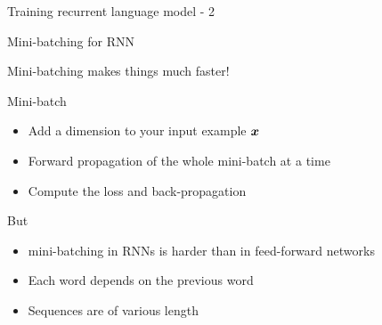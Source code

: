 \begin{frame}{Training recurrent language model - 2}
\begin{center}
      \end{center}
\end{frame}




\begin{frame}{Mini-batching for RNN}
  \begin{center}
    Mini-batching makes things much faster!
  \end{center}
  \begin{block}{Mini-batch}
    \begin{itemize}
    \item Add a dimension to your input example $\boldsymbol{x}$
    \item Forward propagation of the whole mini-batch at a time
    \item Compute the loss and back-propagation
    \end{itemize}
  \end{block}

  \begin{block}{But}
    \begin{itemize}
    \item mini-batching in RNNs is harder than in feed-forward
      networks
    \item Each word depends on the previous word
    \item Sequences are of various length
    \end{itemize}
  \end{block}

\end{frame}


